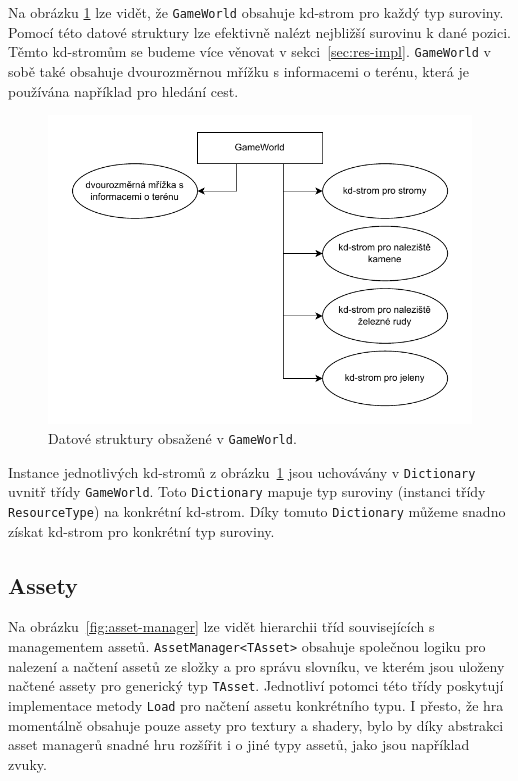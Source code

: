 Na obrázku \ref{fig:game-world} lze vidět, že \texttt{GameWorld} obsahuje kd-strom pro každý typ suroviny. Pomocí této datové struktury lze efektivně nalézt nejbližší surovinu k dané pozici. Těmto kd-stromům se budeme více věnovat v sekci~\ref{sec:res-impl}. \texttt{GameWorld} v sobě také obsahuje dvourozměrnou mřížku s informacemi o terénu, která je používána například pro hledání cest.

\begin{figure}[!htb]
  \centering
  \includegraphics[width=0.8\linewidth]{img/game-world.pdf}
  \caption{Datové struktury obsažené v \texttt{GameWorld}.}
  \label{fig:game-world}
\end{figure}

Instance jednotlivých kd-stromů z obrázku~\ref{fig:game-world} jsou uchovávány v \texttt{Dictionary} uvnitř třídy \texttt{GameWorld}. Toto \texttt{Dictionary} mapuje typ suroviny (instanci třídy \texttt{ResourceType}) na konkrétní kd-strom. Díky tomuto \texttt{Dictionary} můžeme snadno získat kd-strom pro konkrétní typ suroviny.

\subsection{Assety}
Na obrázku~\ref{fig:asset-manager} lze vidět hierarchii tříd souvisejících s managementem assetů. \texttt{AssetManager<TAsset>} obsahuje společnou logiku pro nalezení a načtení assetů ze složky a pro správu slovníku, ve kterém jsou uloženy načtené assety pro generický typ \texttt{TAsset}. Jednotliví potomci této třídy poskytují implementace metody \texttt{Load} pro načtení assetu konkrétního typu. I přesto, že hra momentálně obsahuje pouze assety pro textury a shadery, bylo by díky abstrakci asset managerů snadné hru rozšířit i o jiné typy assetů, jako jsou například zvuky.

